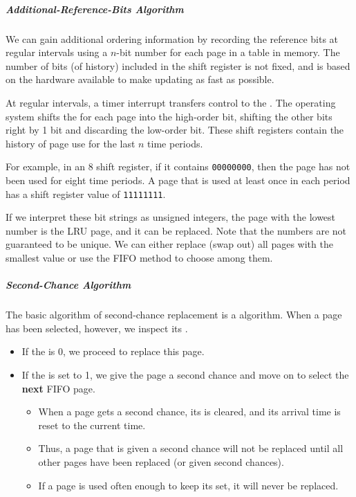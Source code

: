 \subparagraph{Additional-Reference-Bits Algorithm}\label{subpar:Additional_Reference_Bits_Algorithm}
We can gain additional ordering information by recording the reference bits at regular intervals using a $n$-bit number for each page in a table in memory.
The number of bits (of history) included in the shift register is not fixed, and is based on the hardware available to make updating as fast as possible.

At regular intervals, a timer interrupt transfers control to the .
The operating system shifts the  for each page into the high-order bit, shifting the other bits right by 1 bit and discarding the low-order bit.
These shift registers contain the history of page use for the last $n$ time periods.

For example, in an \SI{8}{\bit} shift register, if it contains \texttt{00000000}, then the page has not been used for eight time periods.
A page that is used at least once in each period has a shift register value of \texttt{11111111}.

If we interpret these bit strings as unsigned integers, the page with the lowest number is the LRU page, and it can be replaced.
Note that the numbers are not guaranteed to be unique.
We can either replace (swap out) all pages with the smallest value or use the FIFO method to choose among them.

\subparagraph{Second-Chance Algorithm}\label{subpar:Second_Chance_Algorithm}
The basic algorithm of second-chance replacement is a  algorithm.
When a page has been selected, however, we inspect its .
\begin{itemize}[noitemsep]
\item If the  is 0, we proceed to replace this page.
\item If the  is set to 1, we give the page a second chance and move on to select the \textbf{next} FIFO page.
  \begin{itemize}[noitemsep]
  \item When a page gets a second chance, its  is cleared, and its arrival time is reset to the current time.
  \item Thus, a page that is given a second chance will not be replaced until all other pages have been replaced (or given second chances).
  \item If a page is used often enough to keep its  set, it will never be replaced.
  \end{itemize}
\end{itemize}

